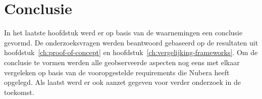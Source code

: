 \section{Conclusie}
In het laatste hoofdstuk werd er op basis van de waarnemingen een conclusie gevormd. De onderzoeksvragen werden beantwoord gebaseerd op de resultaten uit hoofdstuk~\ref{ch:proof-of-concept} en hoofdstuk~\ref{ch:vergelijking-frameworks}. Om de conclusie te vormen werden alle geobserveerde aspecten nog eens met elkaar vergeleken op basis van de vooropgestelde requirements die Nubera heeft opgelegd. Als laatst werd er ook aanzet gegeven voor verder onderzoek in de toekomst.